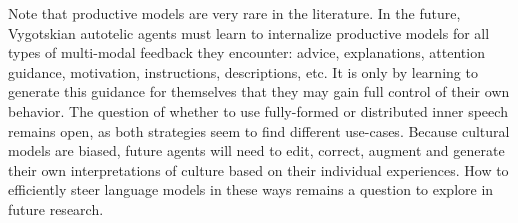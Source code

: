 Note that productive models are very rare in the literature. In the future, Vygotskian autotelic agents must learn to internalize productive models for all types of multi-modal feedback they encounter: advice, explanations, attention guidance, motivation, instructions, descriptions, etc. It is only by learning to generate this guidance for themselves that they may gain full control of their own behavior. The question of whether to use fully-formed or distributed inner speech remains open, as both strategies seem to find different use-cases. Because cultural models are biased, future agents will need to edit, correct, augment and generate their own interpretations of culture based on their individual experiences. How to efficiently steer language models in these ways remains a question to explore in future research. 

%
%
%
%
%
%
%

